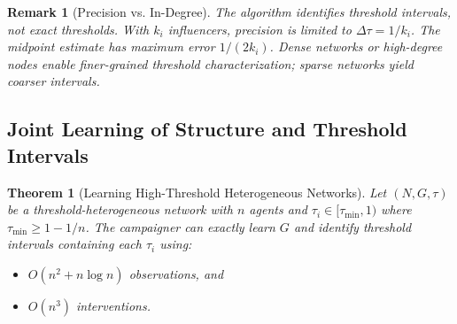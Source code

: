 \documentclass[conference]{IEEEtran}
\newtheorem{theorem}{Theorem}
\newtheorem{remark}{Remark}
\begin{document}
\begin{remark}[Precision vs. In-Degree]
\label{rem:precision}
The algorithm identifies threshold intervals, not exact thresholds. With $k_i$ influencers, precision is limited to $\Delta\tau = 1/k_i$. The midpoint estimate has maximum error $1/(2k_i)$. Dense networks or high-degree nodes enable finer-grained threshold characterization; sparse networks yield coarser intervals.
\end{remark}

\subsection{Joint Learning of Structure and Threshold Intervals}

\begin{theorem}[Learning High-Threshold Heterogeneous Networks]
\label{thm:main_learning}
Let $(N, G, \tau)$ be a threshold-heterogeneous network with $n$ agents and $\tau_i \in [\tau_{\min}, 1)$ where $\tau_{\min} \geq 1 - 1/n$. The campaigner can exactly learn $G$ and identify threshold intervals containing each $\tau_i$ using:
\begin{itemize}
\item $O(n^2 + n \log n)$ observations, and
\item $O(n^3)$ interventions.
\end{itemize}
\end{theorem}
\end{document}
